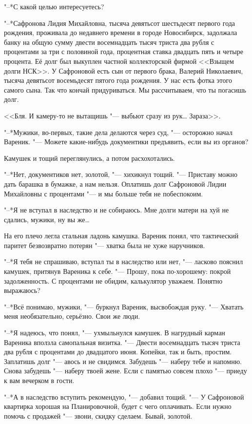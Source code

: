 "--*С какой целью интересуетесь?

"--*Сафронова Лидия Михайловна, тысяча девятьсот шестьдесят первого года рождения, проживала до недавнего времени в городе Новосибирск, задолжала банку на общую сумму двести восемнадцать тысяч триста два рубля с процентами за три с половиной года, процентная ставка двадцать пять и четыре процента.
Её долг был выкуплен частной коллекторской фирмой <<Взыщем долги НСК>>.
У Сафроновой есть сын от первого брака, Валерий Николаевич, тысяча девятьсот восемьдесят пятого года рождения.
У нас есть фотка этого самого сына.
Так что кончай придуриваться.
Мы рассчитываем, что ты погасишь долг.

<<Бля.
И камеру-то не вытащишь "--- выбьют сразу из рук\ldots{}
Зараза>>.

"--*Мужики, во-первых, такие дела делаются через суд, "--- осторожно начал Вареник.
"--- Можете какие-нибудь документики предъявить, если вы из органов?

Камушек и тощий переглянулись, а потом расхохотались.

"--*Нет, документиков нет, золотой, "--- хихикнул тощий.
"--- Приставу можно дать барашка в бумажке, а нам нельзя.
Оплатишь долг Сафроновой Лидии Михайловны с процентами "--- и мы больше тебя не побеспокоим.

"--*Я не вступал в наследство и не собираюсь.
Мне долги матери на хуй не сдались, мужики, ну вы же\ldots{}

На его плечо легла стальная ладонь камушка.
Вареник понял, что тактический паритет безвозвратно потерян "--- хватка была не хуже наручников.

"--*Я тебя не спрашиваю, вступал ты в наследство или нет, "--- ласково пояснил камушек, притянув Вареника к себе.
"--- Прошу, пока по-хорошему: покрой задолженность.
С процентами не обидим, калькулятор уважаем.
Понятно выражаюсь?

"--*Всё понимаю, мужики, "--- буркнул Вареник, высвобождая руку.
"--- Хватать меня необязательно, серьёзно.
Свои же люди.

"--*Я надеюсь, что понял, "--- ухмыльнулся камушек.
В нагрудный карман Вареника вползла самопальная визитка.
"--- Двести восемнадцать тысяч триста два рубля с процентами до двадцатого июня.
Копейки, так и быть, простим.
Заплатишь долг "--- авось и не свидимся.
Забудешь "--- наберу тебе и напомню.
Снова забудешь "--- наберу твоей жене.
Если с памятью совсем плохо "--- приеду к вам вечерком в гости.

"--*А в наследство вступить рекомендую, "--- добавил тощий.
"--- У Сафроновой квартирка хорошая на Планировочной, будет с чего оплачивать.
Если нужно помочь с продажей "--- звони, скидку сделаем.
Бывай, золотой.


